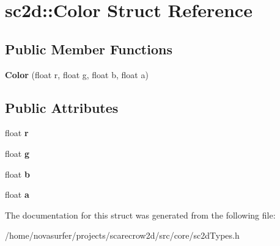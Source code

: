 \hypertarget{structsc2d_1_1Color}{}\section{sc2d\+:\+:Color Struct Reference}
\label{structsc2d_1_1Color}
\subsection*{Public Member Functions}
\begin{DoxyCompactItemize}
\item 
\mbox{\label{structsc2d_1_1Color_af4ad3755aa6aa4c6bd6cc86b28827726}} 
{\bfseries Color} (float r, float g, float b, float a)
\end{DoxyCompactItemize}
\subsection*{Public Attributes}
\begin{DoxyCompactItemize}
\item 
\mbox{\label{structsc2d_1_1Color_a84f517eb6bec1a27f377a5a9ffd52815}} 
float {\bfseries r}
\item 
\mbox{\label{structsc2d_1_1Color_a8580190b71b622302a2d95182ce0a4ca}} 
float {\bfseries g}
\item 
\mbox{\label{structsc2d_1_1Color_a827d3d2b2da3e3d6d0829f1c8346e93f}} 
float {\bfseries b}
\item 
\mbox{\label{structsc2d_1_1Color_aac740ecc4d6a7bde79ff119f5b96c653}} 
float {\bfseries a}
\end{DoxyCompactItemize}


The documentation for this struct was generated from the following file\+:\begin{DoxyCompactItemize}
\item 
/home/novasurfer/projects/scarecrow2d/src/core/sc2d\+Types.\+h\end{DoxyCompactItemize}
